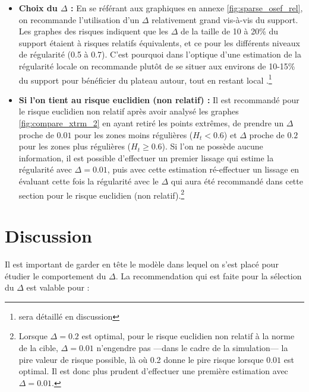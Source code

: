 \begin{itemize}
\bigskip

\item \textbf{Choix du $\Delta$ : } En se référant aux graphiques en annexe \ref{fig:sparse_osef_rel}, on recommande l'utilisation d'un $\Delta$ relativement grand vis-à-vis du support. Les graphes des risques indiquent que les $\Delta$ de la taille de 10 à 20\% du support étaient à risques relatifs équivalents, et ce pour les différents niveaux de régularité (0.5 à 0.7). C'est pourquoi dans l'optique d'une estimation de la régularité \og locale \fg on recommande plutôt de se situer aux environs de 10-15\% du support pour bénéficier du plateau autour, tout en restant \og local \fg.\footnote{sera détaillé en discussion}

\bigskip

\item \textbf{Si l'on tient au risque euclidien (non relatif) : } Il est recommandé pour le risque euclidien non relatif après avoir analysé les graphes \ref{fig:compare_xtrm_2} en ayant retiré les points extrêmes, de prendre un $\Delta$ proche de $0.01$ pour les zones moins régulières ($H_t < 0.6$) et $\Delta$ proche de $0.2$ pour les zones plus régulières ($H_t \geq 0.6$). Si l'on ne possède aucune information, il est possible d'effectuer un premier lissage qui estime la régularité avec $\Delta = 0.01$, puis avec cette estimation ré-effectuer un lissage en évaluant cette fois la régularité avec le $\Delta$ qui aura été recommandé dans cette section pour le risque euclidien (non relatif).\footnote{Lorsque $\Delta = 0.2$ est optimal, pour le risque euclidien non relatif à la norme de la cible, $\Delta = 0.01$ n'engendre pas —dans le cadre de la simulation— la pire valeur de risque possible, là où 0.2 donne le pire risque lorsque $0.01$ est optimal. Il est donc plus prudent d'effectuer une première estimation avec $\Delta = 0.01$.}
\end{itemize}

\section{Discussion}

Il est important de garder en tête le modèle dans lequel on s'est placé pour étudier le comportement du $\Delta$. La recommendation qui est faite pour la sélection du $\Delta$ est valable pour :

